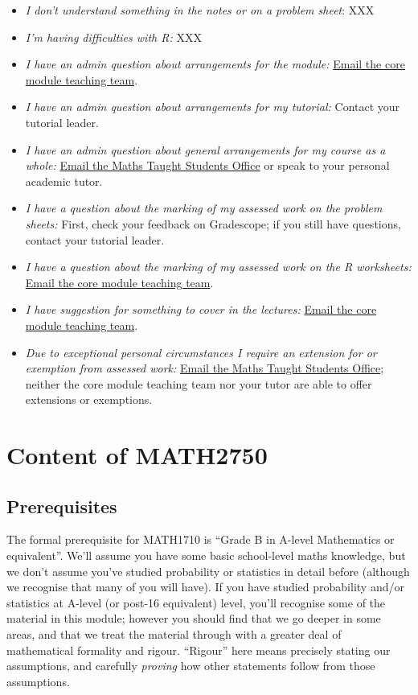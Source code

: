\documentclass[
  a4paper,
]{book}
\providecommand{\tightlist}{%
  \setlength{\itemsep}{0pt}\setlength{\parskip}{0pt}}
\theoremstyle{definition}
\theoremstyle{definition}
\theoremstyle{definition}
\theoremstyle{remark}
\begin{document}
\begin{itemize}
\tightlist
\item
  \emph{I don't understand something in the notes or on a problem sheet}: XXX
\item
  \emph{I'm having difficulties with R:} XXX
\item
  \emph{I have an admin question about arrangements for the module:} \href{mailto:math1710@leeds.ac.uk}{Email the core module teaching team}.
\item
  \emph{I have an admin question about arrangements for my tutorial:} Contact your tutorial leader.
\item
  \emph{I have an admin question about general arrangements for my course as a whole:} \href{mailto:Maths.Taught.Students@leeds.ac.uk}{Email the Maths Taught Students Office} or speak to your personal academic tutor.
\item
  \emph{I have a question about the marking of my assessed work on the problem sheets:} First, check your feedback on Gradescope; if you still have questions, contact your tutorial leader.
\item
  \emph{I have a question about the marking of my assessed work on the R worksheets:} \href{mailto:math1710@leeds.ac.uk}{Email the core module teaching team}.
\item
  \emph{I have suggestion for something to cover in the lectures:} \href{mailto:math1710@leeds.ac.uk}{Email the core module teaching team}.
\item
  \emph{Due to exceptional personal circumstances I require an extension for or exemption from assessed work:} \href{mailto:Maths.Taught.Students@leeds.ac.uk}{Email the Maths Taught Students Office}; neither the core module teaching team nor your tutor are able to offer extensions or exemptions.
\end{itemize}

\hypertarget{about-content}{%
\section*{Content of MATH2750}\label{about-content}}

\hypertarget{prereqs}{%
\subsection*{Prerequisites}\label{prereqs}}

The formal prerequisite for MATH1710 is ``Grade B in A-level Mathematics or equivalent''. We'll assume you have some basic school-level maths knowledge, but we don't assume you've studied probability or statistics in detail before (although we recognise that many of you will have). If you have studied probability and/or statistics at A-level (or post-16 equivalent) level, you'll recognise some of the material in this module; however you should find that we go deeper in some areas, and that we treat the material through with a greater deal of mathematical formality and rigour. ``Rigour'' here means precisely stating our assumptions, and carefully \emph{proving} how other statements follow from those assumptions.
\end{document}
